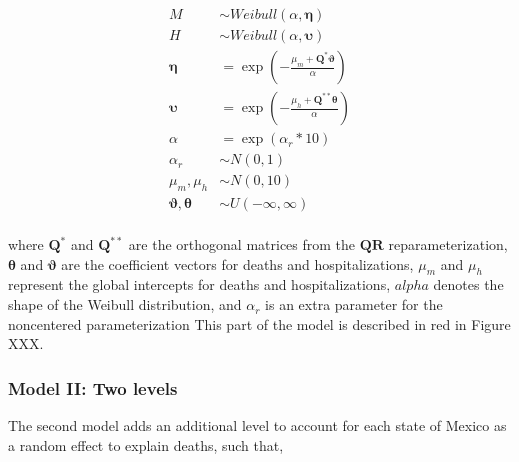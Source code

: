 \documentclass[10pt,letterpaper]{article}
\begin{document}
\[
\begin{aligned}
 {M}  &\sim Weibull(\alpha,\mathbf{\eta})\\
 {H}  &\sim Weibull(\alpha,\mathbf{\upsilon}) \\
 \mathbf{\eta} &= \exp\left(-\frac{\mu_m+\mathbf{Q}^*\mathbf{\vartheta}}{\alpha}\right) \\
 \mathbf{\upsilon} &= \exp\left(-\frac{\mu_h+\mathbf{Q}^{**}\mathbf{\theta}}{\alpha}\right) \\
 \alpha&=\exp(\alpha_r*10) \\
 \alpha_r&\sim N(0,1) \\
 \mu_m,\mu_h &\sim N(0,10) \\
 \mathbf{\vartheta},\mathbf{\theta} &\sim U(-\infty,\infty) \\
\end{aligned}
\]

where \(\mathbf{Q}^*\) and \(\mathbf{Q}^{**}\) are the orthogonal
matrices from the \(\mathbf{QR}\) reparameterization,
\(\mathbf{\theta}\) and \(\mathbf{\vartheta}\) are the coefficient
vectors for deaths and hospitalizations, \(\mu_m\) and \(\mu_h\)
represent the global intercepts for deaths and hospitalizations,
\(alpha\) denotes the shape of the Weibull distribution, and
\(\alpha_r\) is an extra parameter for the noncentered parameterization
This part of the model is described in red in Figure XXX.

\hypertarget{model-ii-two-levels}{%
\subsubsection{Model II: Two levels}\label{model-ii-two-levels}}

The second model adds an additional level to account for each state of
Mexico as a random effect to explain deaths, such that,
\end{document}
